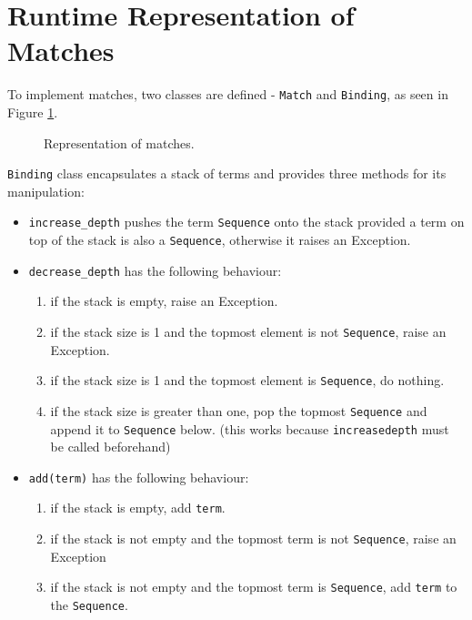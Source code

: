 \section{Runtime Representation of Matches}
\label{section:Match}

To implement matches, two classes are defined - \texttt{Match} and \texttt{Binding}, as seen in Figure \ref{class-diagram-match-binding}.

\begin{figure}[H]
	\centering
	\caption{Representation of matches.}
\label{class-diagram-match-binding}
\end{figure}

\texttt{Binding} class encapsulates a stack of terms and provides three methods for its manipulation:

\begin{itemize}
\item 
\texttt{increase\_depth} pushes the term \texttt{Sequence} onto the stack provided a term on top of the stack is also a \texttt{Sequence}, otherwise it raises an Exception.

\item
\texttt{decrease\_depth} has the following behaviour:
	\begin{enumerate}
		\item
        if the stack is empty, raise an Exception.
		\item
		if the stack size is 1 and the topmost element is not \texttt{Sequence}, raise an Exception.
		\item
		if the stack size is 1 and the topmost element is \texttt{Sequence}, do nothing.
		\item
        if the stack size is greater than one, pop the topmost \texttt{Sequence} and append it to \texttt{Sequence} below. (this works because \texttt{increasedepth} must be called beforehand)
	\end{enumerate}

\item
\texttt{add(term)} has the following behaviour:
	\begin{enumerate}
		\item
         if the stack is empty, add \texttt{term}. 
		\item
         if the stack is not empty and the topmost term is not \texttt{Sequence}, raise an Exception
		\item
        if the stack is not empty and the topmost term is \texttt{Sequence}, add \texttt{term} to the \texttt{Sequence}.
	\end{enumerate}
\end{itemize}

